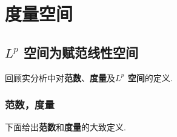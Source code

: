 \ifx\allfiles\undefined


	\else
	\fi
\chapter{度量空间}

\section{$L^p$ 空间为赋范线性空间}
\begin{center}
	回顾实分析中对\textbf{范数}、\textbf{度量}及\textbf{$L^p$ 空间}的定义.
\end{center}
	
\subsection{范数，度量}
	下面给出\textbf{范数}和\textbf{度量}的大致定义.
